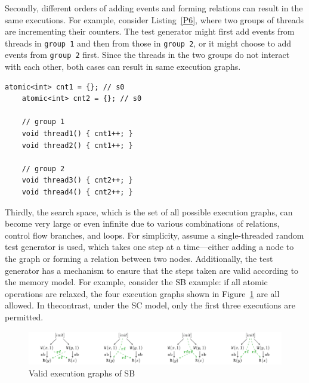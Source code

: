 Secondly, different orders of adding events and forming relations can result in the same executions. For example, consider Listing~\ref{P6}, where two groups of threads are incrementing their counters. The test generator might first add events from threads in \texttt{group 1} and then from those in \texttt{group 2}, or it might choose to add events from \texttt{group 2} first. Since the threads in the two groups do not interact with each other, both cases can result in same execution graphs.


\begin{lstlisting}[caption={P6}, label={P6}]
    atomic<int> cnt1 = {}; // s0
    atomic<int> cnt2 = {}; // s0
    
    // group 1
    void thread1() { cnt1++; }
    void thread2() { cnt1++; }

    // group 2
    void thread3() { cnt2++; }
    void thread4() { cnt2++; }

\end{lstlisting}


Thirdly, the search space, which is the set of all possible execution graphs, can become very large or even infinite due to various combinations of relations, control flow branches, and loops. For simplicity, assume a single-threaded random test generator is used, which takes one step at a time—either adding a node to the graph or forming a relation between two nodes. Additionally, the test generator has a mechanism to ensure that the steps taken are valid according to the memory model. For example, consider the SB example: if all atomic operations are relaxed, the four execution graphs shown in Figure~\ref{SB4} are all allowed. In thecontrast, under the SC model, only the first three executions are permitted.


\begin{figure}[h!tbp] %
    \centering
    \includegraphics[scale=0.8]{figure/exec-graph/SB4.pdf} %
    \caption{Valid execution graphs of SB} %
    \label{SB4} %
\end{figure}




